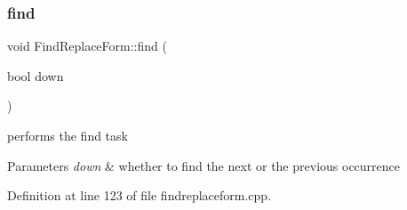 \subsubsection{\texorpdfstring{find}{find}\hspace{0.1cm}{\footnotesize\ttfamily [1/2]}}
{\footnotesize\ttfamily void Find\+Replace\+Form\+::find (\begin{DoxyParamCaption}\item[{bool}]{down }\end{DoxyParamCaption})\hspace{0.3cm}{\ttfamily [slot]}}

performs the find task 
\begin{DoxyParams}{Parameters}
{\em down} & whether to find the next or the previous occurrence \\
\hline
\end{DoxyParams}


Definition at line 123 of file findreplaceform.\+cpp.


